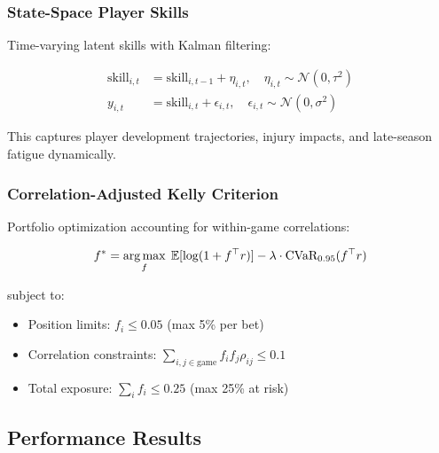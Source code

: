 \subsubsection{State-Space Player Skills}

Time-varying latent skills with Kalman filtering:

\begin{align}
\text{skill}_{i,t} &= \text{skill}_{i,t-1} + \eta_{i,t}, \quad \eta_{i,t} \sim \mathcal{N}(0, \tau^2) \\
y_{i,t} &= \text{skill}_{i,t} + \epsilon_{i,t}, \quad \epsilon_{i,t} \sim \mathcal{N}(0, \sigma^2)
\end{align}

This captures player development trajectories, injury impacts, and late-season fatigue dynamically.

\subsubsection{Correlation-Adjusted Kelly Criterion}

Portfolio optimization accounting for within-game correlations:

\begin{equation}
f^* = \operatorname*{arg\,max}_f \; \mathbb{E}[\log(1 + f^\top r)] - \lambda \cdot \text{CVaR}_{0.95}(f^\top r)
\end{equation}

subject to:
\begin{itemize}
  \item Position limits: $f_i \leq 0.05$ (max 5\% per bet)
  \item Correlation constraints: $\sum_{i,j \in \text{game}} f_i f_j \rho_{ij} \leq 0.1$
  \item Total exposure: $\sum_i f_i \leq 0.25$ (max 25\% at risk)
\end{itemize}

\subsection{Performance Results}


